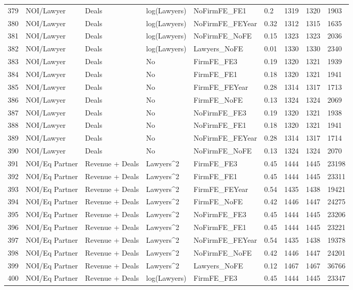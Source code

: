 \begin{table}[ht]
\begin{tabular}{rllllllll}
  379 & NOI/Lawyer & Deals & log(Lawyers) & NoFirmFE\_FE1 & 0.2 & 1319 & 1320 & 1903 \\ 
  380 & NOI/Lawyer & Deals & log(Lawyers) & NoFirmFE\_FEYear & 0.32 & 1312 & 1315 & 1635 \\ 
  381 & NOI/Lawyer & Deals & log(Lawyers) & NoFirmFE\_NoFE & 0.15 & 1323 & 1323 & 2036 \\ 
  382 & NOI/Lawyer & Deals & log(Lawyers) & Lawyers\_NoFE & 0.01 & 1330 & 1330 & 2340 \\ 
  383 & NOI/Lawyer & Deals & No & FirmFE\_FE3 & 0.19 & 1320 & 1321 & 1939 \\ 
  384 & NOI/Lawyer & Deals & No & FirmFE\_FE1 & 0.18 & 1320 & 1321 & 1941 \\ 
  385 & NOI/Lawyer & Deals & No & FirmFE\_FEYear & 0.28 & 1314 & 1317 & 1713 \\ 
  386 & NOI/Lawyer & Deals & No & FirmFE\_NoFE & 0.13 & 1324 & 1324 & 2069 \\ 
  387 & NOI/Lawyer & Deals & No & NoFirmFE\_FE3 & 0.19 & 1320 & 1321 & 1938 \\ 
  388 & NOI/Lawyer & Deals & No & NoFirmFE\_FE1 & 0.18 & 1320 & 1321 & 1941 \\ 
  389 & NOI/Lawyer & Deals & No & NoFirmFE\_FEYear & 0.28 & 1314 & 1317 & 1714 \\ 
  390 & NOI/Lawyer & Deals & No & NoFirmFE\_NoFE & 0.13 & 1324 & 1324 & 2070 \\ 
  391 & NOI/Eq Partner & Revenue + Deals & Lawyers^2 & FirmFE\_FE3 & 0.45 & 1444 & 1445 & 23198 \\ 
  392 & NOI/Eq Partner & Revenue + Deals & Lawyers^2 & FirmFE\_FE1 & 0.45 & 1444 & 1445 & 23311 \\ 
  393 & NOI/Eq Partner & Revenue + Deals & Lawyers^2 & FirmFE\_FEYear & 0.54 & 1435 & 1438 & 19421 \\ 
  394 & NOI/Eq Partner & Revenue + Deals & Lawyers^2 & FirmFE\_NoFE & 0.42 & 1446 & 1447 & 24275 \\ 
  395 & NOI/Eq Partner & Revenue + Deals & Lawyers^2 & NoFirmFE\_FE3 & 0.45 & 1444 & 1445 & 23206 \\ 
  396 & NOI/Eq Partner & Revenue + Deals & Lawyers^2 & NoFirmFE\_FE1 & 0.45 & 1444 & 1445 & 23221 \\ 
  397 & NOI/Eq Partner & Revenue + Deals & Lawyers^2 & NoFirmFE\_FEYear & 0.54 & 1435 & 1438 & 19378 \\ 
  398 & NOI/Eq Partner & Revenue + Deals & Lawyers^2 & NoFirmFE\_NoFE & 0.42 & 1446 & 1447 & 24201 \\ 
  399 & NOI/Eq Partner & Revenue + Deals & Lawyers^2 & Lawyers\_NoFE & 0.12 & 1467 & 1467 & 36766 \\ 
  400 & NOI/Eq Partner & Revenue + Deals & log(Lawyers) & FirmFE\_FE3 & 0.45 & 1444 & 1445 & 23347 \\ 
   \hline
\end{tabular}
\end{table}
